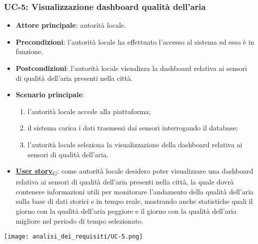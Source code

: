 \subsubsection{UC-5: Visualizzazione dashboard qualità dell'aria}
\begin{itemize}
	\item \textbf{Attore principale}: autorità locale.
	\item \textbf{Precondizioni}: l'autorità locale ha effettuato l'accesso al sistema ed esso è in funzione.
	\item \textbf{Postcondizioni}: l'autorità locale visualizza la dashboard relativa
	      ai sensori di qualità dell'aria presenti nella città.
	\item \textbf{Scenario principale}:
	      \begin{enumerate}
		      \item l'autorità locale accede alla piattaforma;
		      \item il sistema carica i dati trasmessi dai sensori interrogando il database;
		      \item l'autorità locale seleziona la visualizzazione della dashboard relativa ai sensori di qualità dell'aria.
	      \end{enumerate}
	\item \href{https://7last.github.io/docs/rtb/documentazione-interna/glossario\#user-story}{\textbf{User story}\textsubscript{G}}:
	      come autorità locale desidero poter visualizzare una dashboard relativa ai sensori di qualità dell'aria presenti nella città, la quale
	      dovrà contenere informazioni utili per monitorare l'andamento della qualità dell'aria sulla base di dati storici e in tempo reale, mostrando
	      anche statistiche quali il giorno con la qualità dell'aria peggiore e il giorno con la qualità dell'aria migliore nel periodo di tempo selezionato.
\end{itemize}
\begin{center}
	\texttt{[image: analisi\_dei\_requisiti/UC-5.png]}
\end{center}


